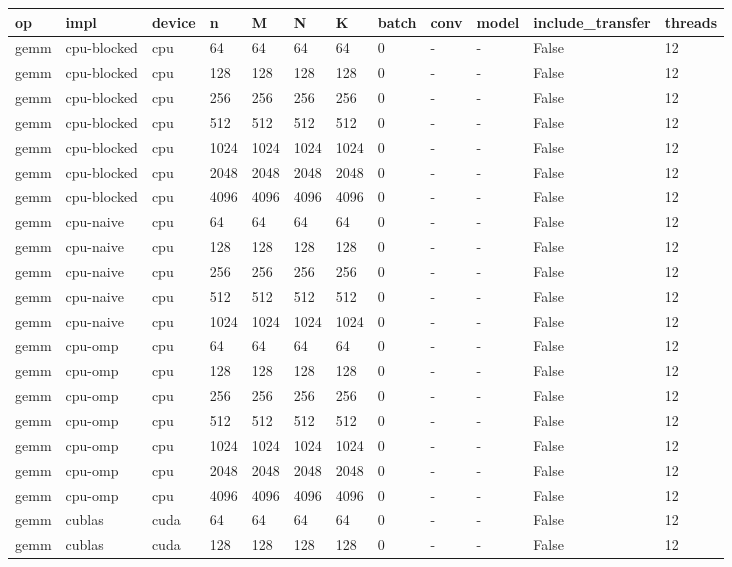 \begin{tabular}{llllllllllll}
\hline
op & impl & device & n & M & N & K & batch & conv & model & include\_transfer & threads \\
\hline
gemm & cpu-blocked & cpu & 64 & 64 & 64 & 64 & 0 & - & - & False & 12 \\
gemm & cpu-blocked & cpu & 128 & 128 & 128 & 128 & 0 & - & - & False & 12 \\
gemm & cpu-blocked & cpu & 256 & 256 & 256 & 256 & 0 & - & - & False & 12 \\
gemm & cpu-blocked & cpu & 512 & 512 & 512 & 512 & 0 & - & - & False & 12 \\
gemm & cpu-blocked & cpu & 1024 & 1024 & 1024 & 1024 & 0 & - & - & False & 12 \\
gemm & cpu-blocked & cpu & 2048 & 2048 & 2048 & 2048 & 0 & - & - & False & 12 \\
gemm & cpu-blocked & cpu & 4096 & 4096 & 4096 & 4096 & 0 & - & - & False & 12 \\
gemm & cpu-naive & cpu & 64 & 64 & 64 & 64 & 0 & - & - & False & 12 \\
gemm & cpu-naive & cpu & 128 & 128 & 128 & 128 & 0 & - & - & False & 12 \\
gemm & cpu-naive & cpu & 256 & 256 & 256 & 256 & 0 & - & - & False & 12 \\
gemm & cpu-naive & cpu & 512 & 512 & 512 & 512 & 0 & - & - & False & 12 \\
gemm & cpu-naive & cpu & 1024 & 1024 & 1024 & 1024 & 0 & - & - & False & 12 \\
gemm & cpu-omp & cpu & 64 & 64 & 64 & 64 & 0 & - & - & False & 12 \\
gemm & cpu-omp & cpu & 128 & 128 & 128 & 128 & 0 & - & - & False & 12 \\
gemm & cpu-omp & cpu & 256 & 256 & 256 & 256 & 0 & - & - & False & 12 \\
gemm & cpu-omp & cpu & 512 & 512 & 512 & 512 & 0 & - & - & False & 12 \\
gemm & cpu-omp & cpu & 1024 & 1024 & 1024 & 1024 & 0 & - & - & False & 12 \\
gemm & cpu-omp & cpu & 2048 & 2048 & 2048 & 2048 & 0 & - & - & False & 12 \\
gemm & cpu-omp & cpu & 4096 & 4096 & 4096 & 4096 & 0 & - & - & False & 12 \\
gemm & cublas & cuda & 64 & 64 & 64 & 64 & 0 & - & - & False & 12 \\
gemm & cublas & cuda & 128 & 128 & 128 & 128 & 0 & - & - & False & 12 \\

\end{tabular}
